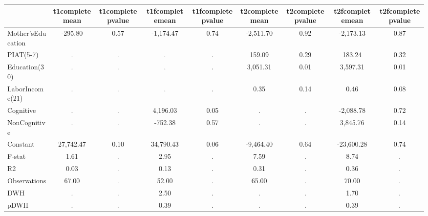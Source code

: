 \begin{table}[htbp]
\begin{tabular}{lcccccccc} \hline \hline
 & t1completemean  & t1completepvalue  & t1fcompletemean  & t1fcompletepvalue  & t2completemean  & t2completepvalue  & t2fcompletemean  & t2fcompletepvalue  \\  \hline 
Mother'sEducation &      -295.80 &         0.57 &    -1,174.47 &         0.74 &    -2,511.70 &         0.92 &    -2,173.13 &         0.87 \\  
PIAT(5-7) &            . &            . &            . &            . &       159.09 &         0.29 &       183.24 &         0.32 \\  
Education(30) &            . &            . &            . &            . &     3,051.31 &         0.01 &     3,597.31 &         0.01 \\  
LaborIncome(21) &            . &            . &            . &            . &         0.35 &         0.14 &         0.46 &         0.08 \\  
Cognitive &            . &            . &     4,196.03 &         0.05 &            . &            . &    -2,088.78 &         0.72 \\  
NonCognitive &            . &            . &      -752.38 &         0.57 &            . &            . &     3,845.76 &         0.14 \\  
Constant &    27,742.47 &         0.10 &    34,790.43 &         0.06 &    -9,464.40 &         0.64 &   -23,600.28 &         0.74 \\  
F-stat &         1.61 &            . &         2.95 &            . &         7.59 &            . &         8.74 &            . \\  
R2 &         0.03 &            . &         0.13 &            . &         0.31 &            . &         0.36 &            . \\  
Observations &        67.00 &            . &        52.00 &            . &        65.00 &            . &        70.00 &            . \\  
DWH &            . &            . &         2.50 &            . &            . &            . &         1.70 &            . \\  
pDWH &            . &            . &         0.39 &            . &            . &            . &         0.39 &            . \\  
\hline \hline \end{tabular}
\end{table}
